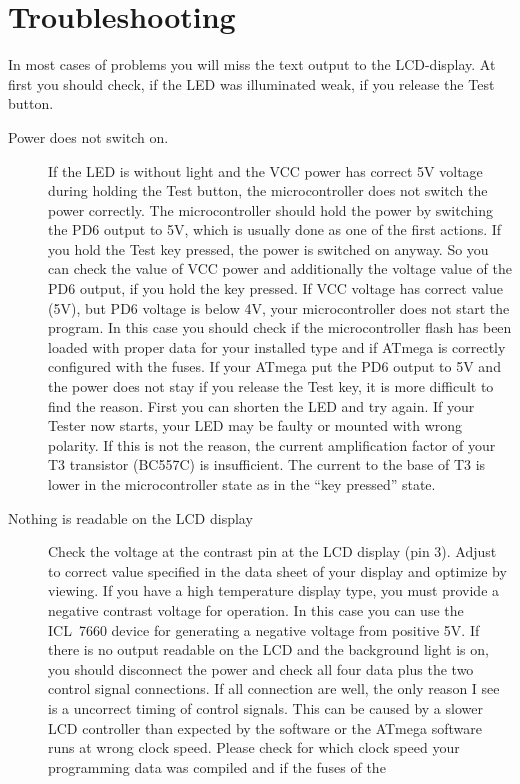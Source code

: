 \section{Troubleshooting}
In most cases of problems you will miss the text output to the LCD-display.
At first you should check, if the LED was illuminated weak, if you release
the Test button. 
\begin{description}
\item[Power does not switch on.]
If the LED is without light and the VCC power has correct
5V voltage during holding the Test button, the microcontroller does not switch the power
correctly. The microcontroller should hold the power by switching the
PD6 output to 5V, which is usually done as one of the first actions.
If you hold the Test key pressed, the power is switched on anyway.
So you can check the value of VCC power and additionally the voltage value
of the PD6 output, if you hold the key pressed.
If VCC voltage has correct value (5V), but PD6 voltage is
below 4V, your microcontroller does not start the program. In this case
you should check if the microcontroller flash has been loaded with proper data for your
installed type and if ATmega is correctly configured with the fuses.
If your ATmega put the PD6 output to 5V and the power does not stay if you
release the Test key, it is more difficult to find the reason.
First you can shorten the LED and try again. If your Tester now starts,
your LED may be faulty or mounted with wrong polarity. If this is not
the reason, the current amplification factor of your T3 transistor (BC557C)
is insufficient. The current to the base of T3 is lower in the microcontroller
state as in the ``key pressed'' state.
\item[Nothing is readable on the LCD display]
Check the voltage at the contrast pin at the LCD display (pin 3). Adjust to
correct value specified in the data sheet of your display and optimize by viewing.
If you have a high temperature display type, you must provide a negative contrast voltage
for operation. In this case you can use the ICL~7660 device for generating
a negative voltage from positive 5V.
If there is no output readable on the LCD and the background light is on,
you should disconnect the power and check all four data plus the two control signal connections.
If all connection are well, the only reason I see is a uncorrect timing of
control signals. This can be caused by a slower LCD controller than expected by
the software or the ATmega software runs at wrong clock speed. Please check for which
clock speed your programming data was compiled  and if the fuses of the

\end{description}
